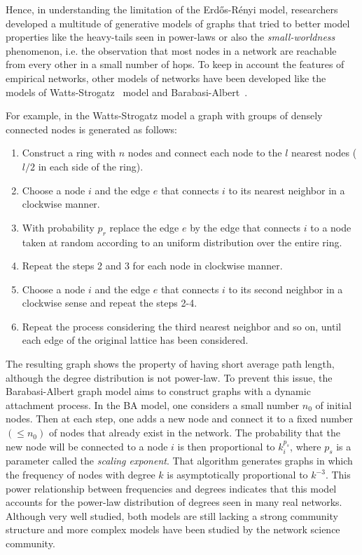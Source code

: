 Hence, in understanding the limitation of the Erd\H{o}s-Rényi model, researchers developed a multitude of generative models of graphs that tried to better model properties like the heavy-tails seen in power-laws or also the \emph{small-worldness} phenomenon, i.e. the observation that most nodes in a network are reachable from every other in a small number of hops.
To keep in account the features of empirical networks, other models of networks have been developed like the models of Watts-Strogatz~\cite{watts1998} model and Barabasi-Albert~\cite{barabasi1999}.

For example, in the Watts-Strogatz model a graph with groups of densely connected nodes is generated as follows:
\begin{enumerate}
\item Construct a ring with $n$ nodes and connect each node to the $l$ nearest nodes ($l/2$ in each side of the ring).
\item Choose a node $i$ and the edge $e$ that connects $i$ to its nearest neighbor in a clockwise manner.
\item With probability $p_r$ replace the edge $e$ by the edge that connects $i$ to a node taken at random according to an uniform distribution over the entire ring.
\item Repeat the steps 2 and 3 for each node in clockwise manner.
\item Choose a node $i$ and the edge $e$ that connects $i$ to its second neighbor in a clockwise sense and repeat the steps 2-4.
\item Repeat the process considering the third nearest neighbor and so on, until each edge of the original lattice has been considered.
\end{enumerate}

The resulting graph shows the property of having short average path length, although the degree distribution is not power-law.
To prevent this issue, the Barabasi-Albert graph model aims to construct graphs with a dynamic attachment process.
In the BA model, one considers a small number $n_0$ of initial nodes. Then at each step, one adds a new node and connect it to a fixed number $(\leq n_0)$ of nodes that already exist in the network. The probability that the new node will be connected to a node $i$ is then proportional to $k_i^{p_s}$,  where $p_s$ is a parameter called the \emph{scaling exponent}. That algorithm generates graphs in which the frequency of nodes with degree $k$ is asymptotically proportional to ${k}^{-3}$. This power relationship between frequencies and degrees indicates that this model accounts for the power-law distribution of degrees seen in many real networks.
Although very well studied, both models are still lacking a strong community structure and more complex models have been studied by the network science community.

